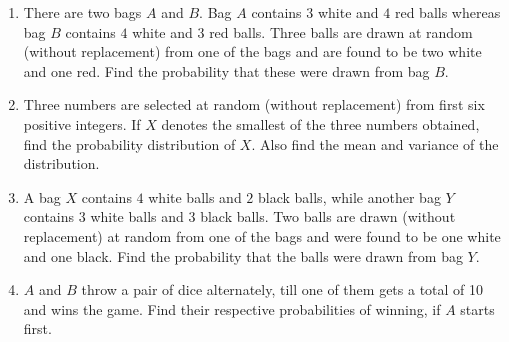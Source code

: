 \begin{enumerate}
    \item There are two bags $A$ and $B$. Bag $A$ contains $3$ white and $4$ red balls whereas bag $B$ contains $4$ white and $3$ red balls. Three balls are drawn at random (without replacement) from one of the bags and are found to be two white and one red. Find the probability that these were drawn from bag $B$.

    \item Three numbers are selected at random (without replacement) from first six positive integers. If $X$ denotes the smallest of the three numbers obtained, find the probability distribution of $X$. Also find the mean and variance of the distribution.


    \item A bag $X$ contains $4$ white balls and $2$ black balls, while another bag $Y$ contains
          $3$ white balls and $3$ black balls. Two balls are drawn (without replacement) at
          random from one of the bags and were found to be one white and one black.
          Find the probability that the balls were drawn from bag $Y$.

    \item $A$ and $B$ throw a pair of dice alternately, till one of them gets a total of 10 and
          wins the game. Find their respective probabilities of winning, if $A$ starts first.


\end{enumerate}

